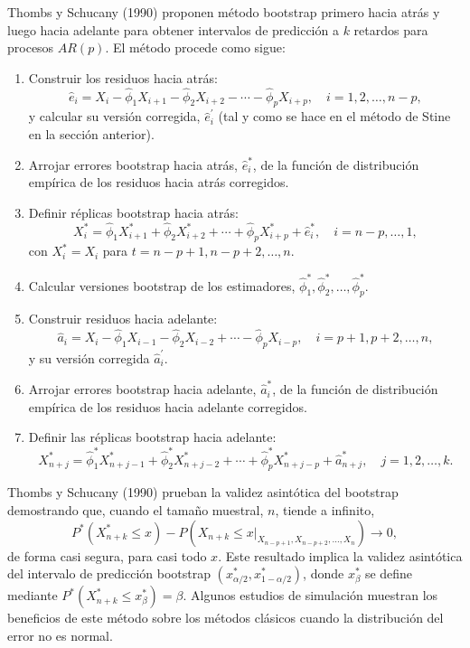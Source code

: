 \documentclass[
]{book}
\theoremstyle{break}
\theoremstyle{nonumberplain}
\begin{document}
Thombs y Schucany (1990) proponen método bootstrap primero hacia atrás y
luego hacia adelante para obtener intervalos de predicción a \(k\)
retardos para procesos \(AR(p)\). El método procede como sigue:

\begin{enumerate}
\def\labelenumi{\arabic{enumi}.}
\item
  Construir los residuos hacia
  atrás:\[\widehat{e}_i=X_i-\widehat{\phi}_1X_{i+1}-\widehat{\phi}
  _2X_{i+2}-\cdots -\widehat{\phi}_{p}X_{i+p},\quad i=1,2,\ldots ,n-p,\]y
  calcular su versión corregida, \(\widehat{e}_i^{\prime}\) (tal y
  como se hace en el método de Stine en la sección anterior).
\item
  Arrojar errores bootstrap hacia atrás, \(\widehat{e}_i^{\ast}\), de
  la función de distribución empírica de los residuos hacia atrás
  corregidos.
\item
  Definir réplicas bootstrap hacia
  atrás:\[X_i^{\ast}=\widehat{\phi}_1X_{i+1}^{\ast}+\widehat{\phi}
  _2X_{i+2}^{\ast}+\cdots +\widehat{\phi}_{p}X_{i+p}^{\ast}+\widehat{e}
  _i^{\ast},\quad i=n-p,\ldots ,1,\]con \(X_i^{\ast}=X_i\) para
  \(t=n-p+1,n-p+2,\ldots ,n\).
\item
  Calcular versiones bootstrap de los estimadores, \(\widehat{\phi}
  _1^{\ast},\widehat{\phi}_2^{\ast},\ldots ,\widehat{\phi}_{p}^{\ast}\).
\item
  Construir residuos hacia adelante:{\[\widehat{a}_i=X_i-\widehat{\phi}_1X_{i-1}-\widehat{\phi}
  _2X_{i-2}+\cdots -\widehat{\phi}_{p}X_{i-p},\quad i=p+1,p+2,\ldots ,n,\]}
  y su versión corregida \(\widehat{a}_i^{\prime}\).
\item
  Arrojar errores bootstrap hacia adelante, \(\widehat{a}_i^{\ast}\),
  de la función de distribución empírica de los residuos hacia
  adelante corregidos.
\item
  Definir las réplicas bootstrap hacia adelante:{\[X_{n+j}^{\ast}=\widehat{\phi}_1^{\ast}X_{n+j-1}^{\ast}+\widehat{\phi}
  _2^{\ast}X_{n+j-2}^{\ast}+\cdots +\widehat{\phi}_{p}^{\ast
  }X_{n+j-p}^{\ast}+\widehat{a}_{n+j}^{\ast},\quad j=1,2,\ldots ,k.\]}
\end{enumerate}

Thombs y Schucany (1990) prueban la validez asintótica del bootstrap
demostrando que, cuando el tamaño muestral, \(n\), tiende a infinito,
\[P^{\ast}\left( X_{n+k}^{\ast}\leq x \right) -P\left( X_{n+k}\leq
x|_{X_{n-p+1},X_{n-p+2},\ldots ,X_n} \right) \rightarrow 0,\]de forma
casi segura, para casi todo \(x\). Este resultado implica la validez
asintótica del intervalo de predicción bootstrap \((x_{\alpha
/2}^{\ast},x_{1-\alpha /2}^{\ast})\), donde \(x_{\beta }^{\ast}\) se
define mediante
\(P^{\ast}\left( X_{n+k}^{\ast}\leq x_{\beta }^{\ast} \right)
=\beta\). Algunos estudios de simulación muestran los beneficios de este
método sobre los métodos clásicos cuando la distribución del error no es
normal.
\end{document}
